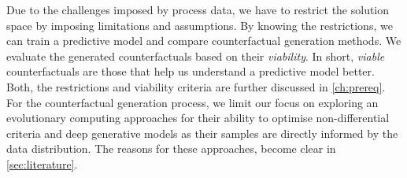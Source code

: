\documentclass[./../../paper.tex]{subfiles}
\begin{document}
Due to the challenges imposed by process data, we have to restrict the solution space by imposing limitations and assumptions. 
By knowing the restrictions, we can train a predictive model and compare counterfactual generation methods. 
We evaluate the generated counterfactuals based on their \emph{viability}. In short, \emph{viable} counterfactuals are those that help us understand a predictive model better.
Both, the restrictions and viability criteria are further discussed in \autoref{ch:prereq}. 
For the counterfactual generation process, we limit our focus on exploring an evolutionary computing approaches for their ability to optimise non-differential criteria and deep generative models as their samples are directly informed by the data distribution. 
The reasons for these approaches, become clear in \autoref{sec:literature}.
\end{document}

